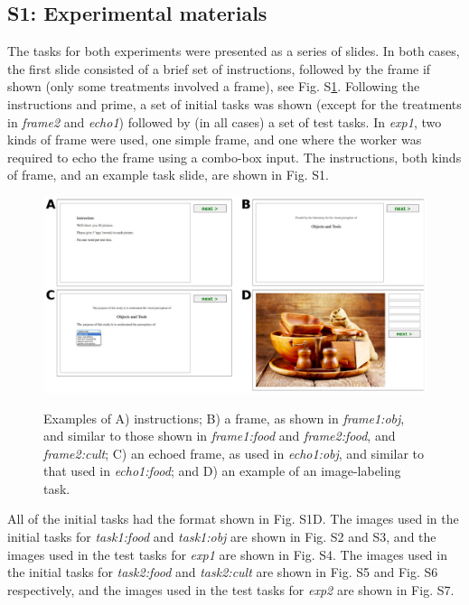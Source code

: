 \documentclass[12pt]{article}
\begin{document}
\subsection*{S1: Experimental materials}
The tasks for both experiments were presented as a series of slides.  In
both cases, the first slide consisted of a brief set of instructions, followed
by the frame if shown (only some treatments involved a frame), see 
Fig. S\ref{fig:hit_preamble}.  Following the instructions and prime, a set
of initial tasks was shown (except for the treatments in \textit{frame2}
and \textit{echo1}) followed by (in all cases) a set of test tasks.  In
\textit{exp1}, two kinds of frame were used, one simple frame, and one where
the worker was required to echo the frame using a combo-box input.  The
instructions, both kinds of frame, and an example task slide, are shown 
in Fig. S1.
\begin{figure}
	\includegraphics[scale=0.8]{figs/tasks.pdf}
	\label{fig:hit_preamble}
	\caption{Examples of A) instructions; B) a frame, as shown in 
		\textit{frame1:obj}, and similar to those shown in 
		\textit{frame1:food} and \textit{frame2:food}, and 
		\textit{frame2:cult};  
		C) an echoed frame, as used in \textit{echo1:obj}, and similar to that
		used in \textit{echo1:food}; and D) an 
		example of an image-labeling task.
	}
\end{figure}

All of the initial tasks had the format shown in Fig. S1D.  The images used
in the initial tasks for \textit{task1:food} and \textit{task1:obj} are
shown in Fig. S2 and S3, and the images used in the test tasks for 
\textit{exp1} are shown in Fig. S4.  The images used in the initial tasks
for \textit{task2:food} and \textit{task2:cult} are shown in Fig. S5 and
Fig. S6 respectively, and the images used in the test tasks for \textit{exp2} 
are shown in Fig. S7.
\end{document}
